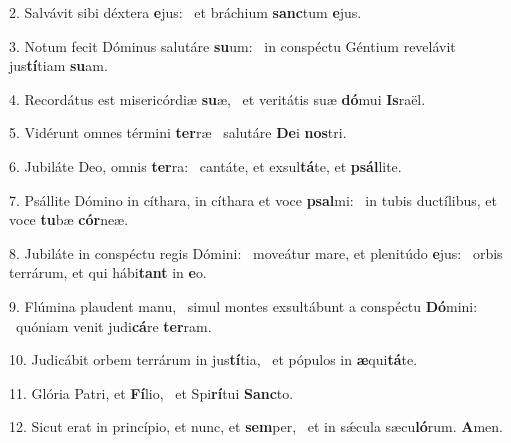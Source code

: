 2. Salvávit sibi déxtera \textbf{e}jus: \ast\  et bráchium \textbf{sanc}tum \textbf{e}jus.\

3. Notum fecit Dóminus salutáre \textbf{su}um: \ast\  in conspéctu Géntium revelávit jus\textbf{tí}tiam \textbf{su}am.\

4. Recordátus est misericórdiæ \textbf{su}æ, \ast\  et veritátis suæ \textbf{dó}mui \textbf{Is}raël.\

5. Vidérunt omnes términi \textbf{ter}ræ \ast\  salutáre \textbf{De}i \textbf{nos}tri.\

6. Jubiláte Deo, omnis \textbf{ter}ra: \ast\  cantáte, et exsul\textbf{tá}te, et \textbf{psál}lite.\

7. Psállite Dómino in cíthara, in cíthara et voce \textbf{psal}mi: \ast\  in tubis ductílibus, et voce \textbf{tu}bæ \textbf{cór}neæ.\

8. Jubiláte in conspéctu regis Dómini: \dag\  moveátur mare, et plenitúdo \textbf{e}jus: \ast\  orbis terrárum, et qui hábi\textbf{tant} in \textbf{e}o.\

9. Flúmina plaudent manu, \dag\  simul montes exsultábunt a conspéctu \textbf{Dó}mini: \ast\  quóniam venit judi\textbf{cá}re \textbf{ter}ram.\

10. Judicábit orbem terrárum in jus\textbf{tí}tia, \ast\  et pópulos in \textbf{æ}qui\textbf{tá}te.\

11. Glória Patri, et \textbf{Fí}lio, \ast\  et Spi\textbf{rí}tui \textbf{Sanc}to.\

12. Sicut erat in princípio, et nunc, et \textbf{sem}per, \ast\  et in sǽcula sæcu\textbf{ló}rum. \textbf{A}men.\

